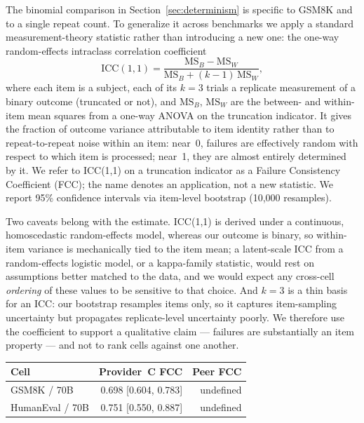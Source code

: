 \documentclass[11pt]{article}
\begin{document}
The binomial comparison in Section~\ref{sec:determinism} is specific
to GSM8K and to a single repeat count. To generalize it across
benchmarks we apply a standard measurement-theory statistic rather
than introducing a new one: the one-way random-effects intraclass
correlation coefficient
\[
\mathrm{ICC}(1,1) = \frac{\mathrm{MS}_B - \mathrm{MS}_W}
{\mathrm{MS}_B + (k-1)\,\mathrm{MS}_W},
\]
\noindent \citep{shrout1979icc, mcgraw1996icc} where each item is a
subject, each of its $k{=}3$ trials a replicate measurement of a
binary outcome (truncated or not), and $\mathrm{MS}_B$,
$\mathrm{MS}_W$ are the between- and within-item mean squares from a
one-way ANOVA on the truncation indicator. It gives the fraction of
outcome variance attributable to item identity rather than to
repeat-to-repeat noise within an item: near~0, failures are
effectively random with respect to which item is processed; near~1,
they are almost entirely determined by it. We refer to ICC(1,1) on a
truncation indicator as a Failure Consistency Coefficient (FCC); the
name denotes an application, not a new statistic. We report 95\%
confidence intervals via item-level bootstrap (10,000 resamples).

Two caveats belong with the estimate. ICC(1,1) is derived under a
continuous, homoscedastic random-effects model, whereas our outcome is
binary, so within-item variance is mechanically tied to the item mean;
a latent-scale ICC from a random-effects logistic model, or a
kappa-family statistic, would rest on assumptions better matched to
the data, and we would expect any cross-cell \emph{ordering} of these
values to be sensitive to that choice. And $k{=}3$ is a thin basis for
an ICC: our bootstrap resamples items only, so it captures
item-sampling uncertainty but propagates replicate-level uncertainty
poorly. We therefore use the coefficient to support a qualitative
claim --- failures are substantially an item property --- and not to
rank cells against one another.

\begin{center}
\small
\begin{tabular}{lrr}
\toprule
\textbf{Cell} & \textbf{Provider~C FCC} & \textbf{Peer FCC} \\
\midrule
GSM8K / 70B      & 0.698 [0.604, 0.783] & undefined \\
HumanEval / 70B  & 0.751 [0.550, 0.887] & undefined \\
\bottomrule
\end{tabular}
\label{tab:fcc}
\end{center}
\end{document}
